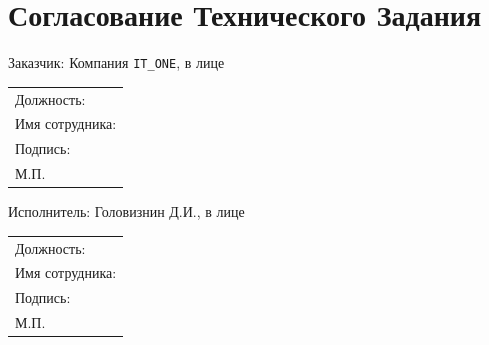 \documentclass[16pt,a4paper]{article}
\begin{document}
\section{Согласование Технического Задания}
\begin{flushright} %
Заказчик: Компания \verb|IT_ONE|, в лице
\begin{tabular}{p{}} %
Должность: \hrulefill \\ %
Имя сотрудника: \hrulefill \\
Подпись: \hrulefill \\
М.П.
\end{tabular}
\vspace{3em}

Исполнитель: Головизнин Д.И., в лице
\begin{tabular}{p{}} %
Должность: \hrulefill \\ %
Имя сотрудника: \hrulefill \\
Подпись: \hrulefill \\
М.П.
\end{tabular}
\end{flushright}
\end{document}
